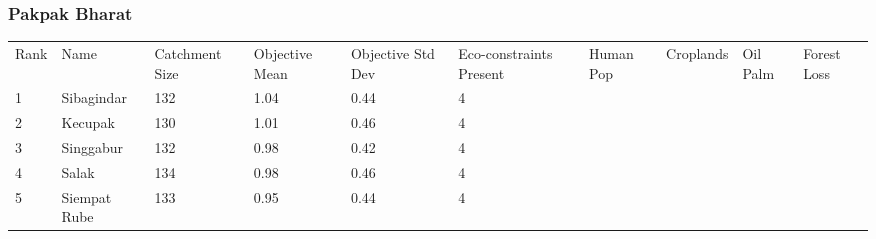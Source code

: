 \subsubsection{Pakpak Bharat}
\begin{table}[ht]
\centering
\begingroup\fontsize{8pt}{9pt}\selectfont
\begin{tabular}{C{0.03\textwidth}C{0.12\textwidth}C{0.09\textwidth}C{0.08\textwidth}C{0.08\textwidth}C{0.08\textwidth}C{0.07\textwidth}C{0.07\textwidth}C{0.07\textwidth}C{0.07\textwidth}}
 Rank & Name & Catchment Size & Objective Mean & Objective Std Dev & Eco-constraints  Present & Human Pop & Croplands & Oil Palm & Forest Loss \\ 
 {1} & Sibagindar & 132 & \textcolor[HTML]{FFFFFF}{1.04} & \textcolor[HTML]{000000}{0.44} & \textcolor[HTML]{000000}{4} &  &  &  &  \\ 
  {2} & Kecupak & 130 & \textcolor[HTML]{FFFFFF}{1.01} & \textcolor[HTML]{000000}{0.46} & \textcolor[HTML]{000000}{4} &  &  &  &  \\ 
  {3} & Singgabur & 132 & \textcolor[HTML]{FFFFFF}{0.98} & \textcolor[HTML]{000000}{0.42} & \textcolor[HTML]{000000}{4} &  &  &  &  \\ 
  {4} & Salak & 134 & \textcolor[HTML]{FFFFFF}{0.98} & \textcolor[HTML]{000000}{0.46} & \textcolor[HTML]{000000}{4} &  &  &  &  \\ 
  {5} & Siempat Rube & 133 & \textcolor[HTML]{000000}{0.95} & \textcolor[HTML]{000000}{0.44} & \textcolor[HTML]{000000}{4} &  &  &  &  \\ 

\end{tabular}
\end{table}
